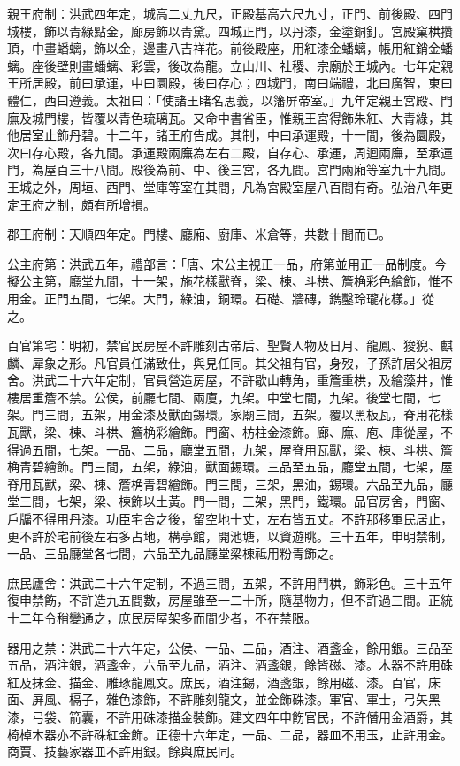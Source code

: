 親王府制：洪武四年定，城高二丈九尺，正殿基高六尺九寸，正門、前後殿、四門城樓，飾以青綠點金，廊房飾以青黛。四城正門，以丹漆，金塗銅釘。宮殿窠栱攢頂，中畫蟠螭，飾以金，邊畫八吉祥花。前後殿座，用紅漆金蟠螭，帳用紅銷金蟠螭。座後壁則畫蟠螭、彩雲，後改為龍。立山川、社稷、宗廟於王城內。七年定親王所居殿，前曰承運，中曰圜殿，後曰存心；四城門，南曰端禮，北曰廣智，東曰體仁，西曰遵義。太祖曰：「使諸王睹名思義，以籓屏帝室。」九年定親王宮殿、門廡及城門樓，皆覆以青色琉璃瓦。又命中書省臣，惟親王宮得飾朱紅、大青綠，其他居室止飾丹碧。十二年，諸王府告成。其制，中曰承運殿，十一間，後為圜殿，次曰存心殿，各九間。承運殿兩廡為左右二殿，自存心、承運，周迴兩廡，至承運門，為屋百三十八間。殿後為前、中、後三宮，各九間。宮門兩廂等室九十九間。王城之外，周垣、西門、堂庫等室在其間，凡為宮殿室屋八百間有奇。弘治八年更定王府之制，頗有所增損。

郡王府制：天順四年定。門樓、廳廂、廚庫、米倉等，共數十間而已。

公主府第：洪武五年，禮部言：「唐、宋公主視正一品，府第並用正一品制度。今擬公主第，廳堂九間，十一架，施花樣獸脊，梁、棟、斗栱、簷桷彩色繪飾，惟不用金。正門五間，七架。大門，綠油，銅環。石礎、牆磚，鐫鑿玲瓏花樣。」從之。

百官第宅：明初，禁官民房屋不許雕刻古帝后、聖賢人物及日月、龍鳳、狻猊、麒麟、犀象之形。凡官員任滿致仕，與見任同。其父祖有官，身歿，子孫許居父祖房舍。洪武二十六年定制，官員營造房屋，不許歇山轉角，重簷重栱，及繪藻井，惟樓居重簷不禁。公侯，前廳七間、兩廈，九架。中堂七間，九架。後堂七間，七架。門三間，五架，用金漆及獸面錫環。家廟三間，五架。覆以黑板瓦，脊用花樣瓦獸，梁、棟、斗栱、簷桷彩繪飾。門窗、枋柱金漆飾。廊、廡、庖、庫從屋，不得過五間，七架。一品、二品，廳堂五間，九架，屋脊用瓦獸，梁、棟、斗栱、簷桷青碧繪飾。門三間，五架，綠油，獸面錫環。三品至五品，廳堂五間，七架，屋脊用瓦獸，梁、棟、簷桷青碧繪飾。門三間，三架，黑油，錫環。六品至九品，廳堂三間，七架，梁、棟飾以土黃。門一間，三架，黑門，鐵環。品官房舍，門窗、戶牖不得用丹漆。功臣宅舍之後，留空地十丈，左右皆五丈。不許那移軍民居止，更不許於宅前後左右多占地，構亭館，開池塘，以資遊眺。三十五年，申明禁制，一品、三品廳堂各七間，六品至九品廳堂梁棟祗用粉青飾之。

庶民廬舍：洪武二十六年定制，不過三間，五架，不許用鬥栱，飾彩色。三十五年復申禁飭，不許造九五間數，房屋雖至一二十所，隨基物力，但不許過三間。正統十二年令稍變通之，庶民房屋架多而間少者，不在禁限。

器用之禁：洪武二十六年定，公侯、一品、二品，酒注、酒盞金，餘用銀。三品至五品，酒注銀，酒盞金，六品至九品，酒注、酒盞銀，餘皆磁、漆。木器不許用硃紅及抹金、描金、雕琢龍鳳文。庶民，酒注錫，酒盞銀，餘用磁、漆。百官，床面、屏風、槅子，雜色漆飾，不許雕刻龍文，並金飾硃漆。軍官、軍士，弓矢黑漆，弓袋、箭囊，不許用硃漆描金裝飾。建文四年申飭官民，不許僭用金酒爵，其椅棹木器亦不許硃紅金飾。正德十六年定，一品、二品，器皿不用玉，止許用金。商賈、技藝家器皿不許用銀。餘與庶民同。
